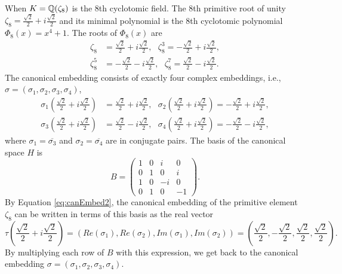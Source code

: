 \documentclass[../main.tex]{subfiles}
\begin{document}
\begin{example}
When $K=\mathbb{Q}(\zeta_8)$ is the 8th cyclotomic field. The 8th primitive root of unity $\zeta_8 = \frac{\sqrt{2}}{2}+ i \frac{\sqrt{2}}{2}$ and its minimal polynomial is the 8th cyclotomic polynomial $\Phi_8(x) = x^4+1$. The roots of $\Phi_8(x)$ are
\begin{align*}
\zeta_8 &= \frac{\sqrt{2}}{2}+ i \frac{\sqrt{2}}{2}, \text{ }
\zeta_8^3 = -\frac{\sqrt{2}}{2}+ i \frac{\sqrt{2}}{2}, \\
\zeta_8^5 &= -\frac{\sqrt{2}}{2}- i \frac{\sqrt{2}}{2}, \text{ }
\zeta_8^7 = \frac{\sqrt{2}}{2}- i \frac{\sqrt{2}}{2}.
\end{align*}
The canonical embedding consists of exactly four complex embeddings, i.e., $\sigma=(\sigma_1,\sigma_2,\sigma_3,\sigma_4)$,  
\begin{align*}
    \sigma_1\left(\frac{\sqrt{2}}{2}+ i \frac{\sqrt{2}}{2}\right) &= \frac{\sqrt{2}}{2}+ i \frac{\sqrt{2}}{2}, \text{ }
    \sigma_2\left(\frac{\sqrt{2}}{2}+ i \frac{\sqrt{2}}{2}\right) = -\frac{\sqrt{2}}{2}+ i \frac{\sqrt{2}}{2}, \\
    \sigma_3\left(\frac{\sqrt{2}}{2}+ i \frac{\sqrt{2}}{2}\right) &= \frac{\sqrt{2}}{2}- i \frac{\sqrt{2}}{2}, \text{ }
    \sigma_4\left(\frac{\sqrt{2}}{2}+ i \frac{\sqrt{2}}{2}\right) = -\frac{\sqrt{2}}{2}- i \frac{\sqrt{2}}{2}, 
\end{align*}
where $\sigma_1=\overline{\sigma_3}$ and $\sigma_2=\overline{\sigma_4}$ are in conjugate pairs. 
The basis of the canonical space $H$ is 
\begin{equation*}
B = \left(
    \begin{matrix}
    1 & 0 & i & 0 \\
    0 & 1 & 0 & i \\
    1 & 0 & -i & 0 \\
    0 & 1 & 0 & -1
    \end{matrix}
\right).
\end{equation*}
By Equation \ref{eq:canEmbed2}, the canonical embedding of the primitive element $\zeta_8$ can be written in terms of this basis as the real vector 
\begin{equation*}
    \tau\left(\frac{\sqrt{2}}{2}+ i \frac{\sqrt{2}}{2}\right)=\left(Re(\sigma_1),Re(\sigma_2),Im(\sigma_1),Im(\sigma_2)\right) =\left(\frac{\sqrt{2}}{2}, -\frac{\sqrt{2}}{2}, \frac{\sqrt{2}}{2}, \frac{\sqrt{2}}{2} \right).
\end{equation*}
By multiplying each row of $B$ with this expression, we get back to the canonical embedding $\sigma=(\sigma_1,\sigma_2,\sigma_3,\sigma_4)$. 
\end{example}
\end{document}
